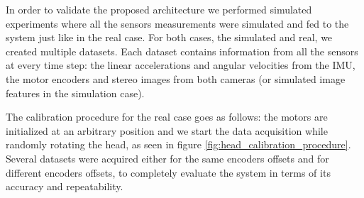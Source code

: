 In order to validate the proposed architecture we performed simulated experiments where all the sensors measurements were simulated and fed to the system just like in the real case. For both cases, the simulated and real, we created multiple datasets. Each dataset contains information from all the sensors at every time step: the linear accelerations and angular velocities from the IMU, the motor encoders and stereo images from both cameras (or simulated image features in the simulation case).

The calibration procedure for the real case goes as follows: the motors are initialized at an arbitrary position and we start the data acquisition while randomly rotating the head, as seen in figure \ref{fig:head_calibration_procedure}. Several datasets were acquired either for the same encoders offsets and for different encoders offsets, to completely evaluate the system in terms of its accuracy and repeatability.

